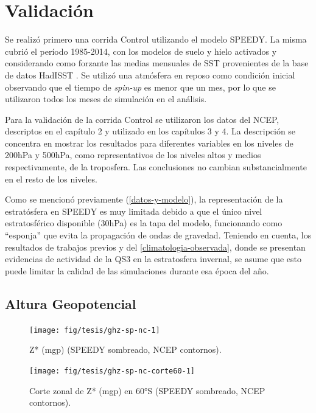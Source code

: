 \documentclass[spanish,a4paper,12pt,oneside]{book}
\begin{document}
\section{Validación}\label{validacion}

Se realizó primero una corrida Control utilizando el modelo SPEEDY. La
misma cubrió el período 1985-2014, con los modelos de suelo y hielo
activados y considerando como forzante las medias mensuales de SST
provenientes de la base de datos HadISST \citep{Rayner2003}. Se utilizó
una atmósfera en reposo como condición inicial observando que el tiempo
de \emph{spin-up} es menor que un mes, por lo que se utilizaron todos
los meses de simulación en el análisis.

Para la validación de la corrida Control se utilizaron los datos del
NCEP, descriptos en el capítulo 2 y utilizado en los capítulos 3 y 4. La
descripción se concentra en mostrar los resultados para diferentes
variables en los niveles de 200hPa y 500hPa, como representativos de los
niveles altos y medios respectivamente, de la troposfera. Las
conclusiones no cambian substancialmente en el resto de los niveles.

Como se mencionó previamente (\autoref{datos-y-modelo}), la
representación de la estratósfera en SPEEDY es muy limitada debido a que
el único nivel estratosférico disponible (30hPa) es la tapa del modelo,
funcionando como ``esponja'' que evita la propagación de ondas de
gravedad. Teniendo en cuenta, los resultados de trabajos previos y del
\autoref{climatologia-observada}, donde se presentan evidencias de
actividad de la QS3 en la estratosfera invernal, se asume que esto puede
limitar la calidad de las simulaciones durante esa época del año.

\subsection{Altura Geopotencial}\label{altura-geopotencial-1}

\begin{landscape}\begin{figure}

{\centering \texttt{[image: fig/tesis/ghz-sp-nc-1]} 

}

\caption{Z* (mgp) (SPEEDY sombreado, NCEP contornos).}\label{fig:ghz-sp-nc}
\end{figure}
\end{landscape}

\begin{figure}
\texttt{[image: fig/tesis/ghz-sp-nc-corte60-1]} \caption{Corte zonal de Z* (mgp) en 60°S (SPEEDY sombreado, NCEP contornos).}\label{fig:ghz-sp-nc-corte60}
\end{figure}
\end{document}
